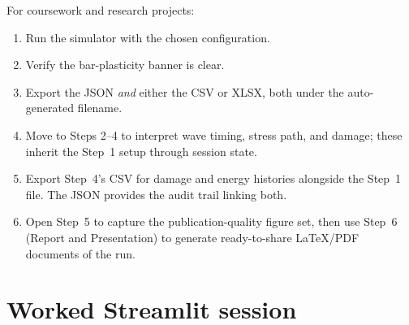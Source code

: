 \documentclass[11pt,a4paper,openany]{book}
\theoremstyle{handbook}
\begin{document}
\begin{conceptbox}
For coursework and research projects:
\begin{enumerate}[leftmargin=2em,itemsep=2pt]
  \item Run the simulator with the chosen configuration.
  \item Verify the bar-plasticity banner is clear.
  \item Export the JSON \emph{and} either the CSV or XLSX, both under the
        auto-generated filename.
  \item Move to Steps 2--4 to interpret wave timing, stress path, and
        damage; these inherit the Step~1 setup through session state.
  \item Export Step~4's CSV for damage and energy histories alongside the
        Step~1 file. The JSON provides the audit trail linking both.
  \item Open Step~5 to capture the publication-quality figure set, then use
        Step~6 (Report and Presentation) to generate ready-to-share
        LaTeX/PDF documents of the run.
\end{enumerate}
\end{conceptbox}

\section{Worked Streamlit session}
\end{document}
